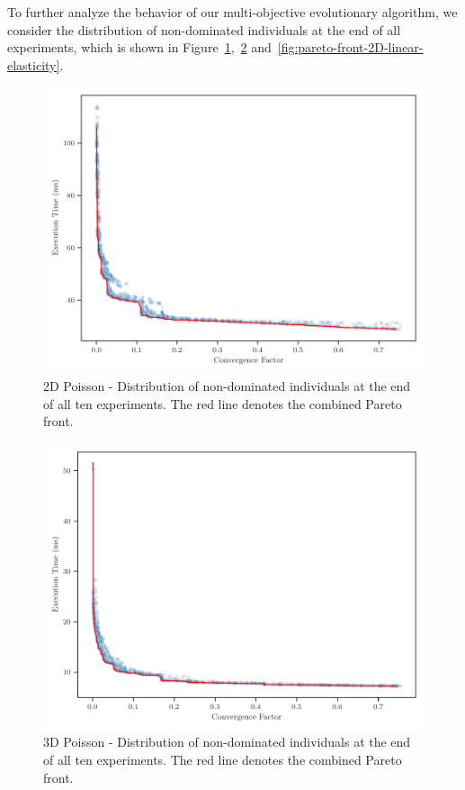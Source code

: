 To further analyze the behavior of our multi-objective evolutionary algorithm, we consider the distribution of non-dominated individuals at the end of all experiments, which is shown in Figure~\ref{fig:pareto-front-2D-poisson},~\ref{fig:pareto-front-3D-poisson} and~\ref{fig:pareto-front-2D-linear-elasticity}.
\begin{figure}
	\includegraphics[width=\columnwidth]{figures/pareto_front_2D_FD_Poisson_fromL2.pdf}
	\caption{2D Poisson - Distribution of non-dominated individuals at the end of all ten experiments. The red line denotes the combined Pareto front.}
	\label{fig:pareto-front-2D-poisson}
\end{figure}
\begin{figure}
	\includegraphics[width=\columnwidth]{figures/pareto_front_3D_FD_Poisson_fromL2.pdf}
	\caption{3D Poisson - Distribution of non-dominated individuals at the end of all ten experiments. The red line denotes the combined Pareto front.}
	\label{fig:pareto-front-3D-poisson}
\end{figure}
